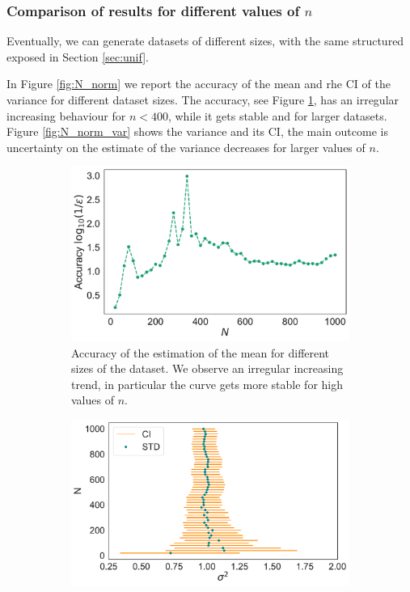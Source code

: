 \documentclass[twoside,onecolumn]{article}
\theoremstyle{definition}
\begin{document}
\subsubsection{Comparison of results for different values of $n$}
Eventually, we can generate datasets of different sizes, with the same structured exposed in Section \ref{sec:unif}.  

In Figure \ref{fig:N_norm} we report the accuracy of the mean and rhe CI of the variance for different dataset sizes. The accuracy, see Figure \ref{fig:N_norm_acc}, has an irregular increasing behaviour for $n<400$, while it gets stable and for larger datasets. Figure \ref{fig:N_norm_var} shows the variance and its CI, the main outcome is uncertainty on the estimate of the variance decreases for larger values of $n$.

\begin{figure} \centering
\begin{subfigure}{0.45\textwidth}
         \includegraphics[width=\textwidth]{../figs/norm_mean_accuracy.pdf}
         \caption{Accuracy of the estimation of the mean for different sizes of the dataset. We observe an irregular increasing trend, in particular the curve gets more stable for high values of $n$.}\label{fig:N_norm_acc}
              \end{subfigure}
     \begin{subfigure}{0.5\textwidth}
         \includegraphics[width=\textwidth]{../figs/norm_variance_CI.pdf}

\end{subfigure}
\end{figure}
\end{document}
